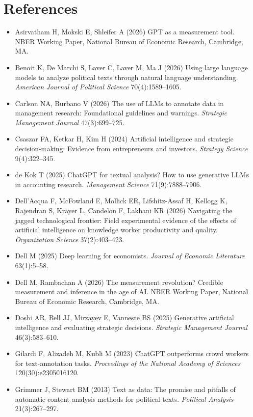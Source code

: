 \documentclass[11pt]{article}
\begin{document}
\section*{References}
\begin{itemize}
    \item Asirvatham H, Mokski E, Shleifer A (2026) GPT as a measurement tool. NBER Working Paper, National Bureau of Economic Research, Cambridge, MA.
    \item Benoit K, De Marchi S, Laver C, Laver M, Ma J (2026) Using large language models to analyze political texts through natural language understanding. \textit{American Journal of Political Science} 70(4):1589--1605.
    \item Carlson NA, Burbano V (2026) The use of LLMs to annotate data in management research: Foundational guidelines and warnings. \textit{Strategic Management Journal} 47(3):699--725.
    \item Csaszar FA, Ketkar H, Kim H (2024) Artificial intelligence and strategic decision-making: Evidence from entrepreneurs and investors. \textit{Strategy Science} 9(4):322--345.
    \item de Kok T (2025) ChatGPT for textual analysis? How to use generative LLMs in accounting research. \textit{Management Science} 71(9):7888--7906.
    \item Dell'Acqua F, McFowland E, Mollick ER, Lifshitz-Assaf H, Kellogg K, Rajendran S, Krayer L, Candelon F, Lakhani KR (2026) Navigating the jagged technological frontier: Field experimental evidence of the effects of artificial intelligence on knowledge worker productivity and quality. \textit{Organization Science} 37(2):403--423.
    \item Dell M (2025) Deep learning for economists. \textit{Journal of Economic Literature} 63(1):5--58.
    \item Dell M, Rambachan A (2026) The measurement revolution? Credible measurement and inference in the age of AI. NBER Working Paper, National Bureau of Economic Research, Cambridge, MA.
    \item Doshi AR, Bell JJ, Mirzayev E, Vanneste BS (2025) Generative artificial intelligence and evaluating strategic decisions. \textit{Strategic Management Journal} 46(3):583--610.
    \item Gilardi F, Alizadeh M, Kubli M (2023) ChatGPT outperforms crowd workers for text-annotation tasks. \textit{Proceedings of the National Academy of Sciences} 120(30):e2305016120.
    \item Grimmer J, Stewart BM (2013) Text as data: The promise and pitfalls of automatic content analysis methods for political texts. \textit{Political Analysis} 21(3):267--297.

\end{itemize}
\end{document}
